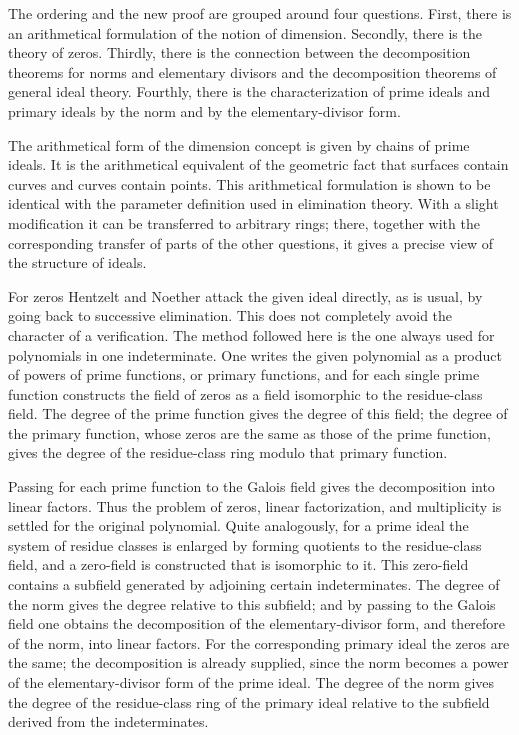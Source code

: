 \documentclass[11pt]{article}
\begin{document}
The ordering and the new proof are grouped around four questions. First, there is an arithmetical formulation of the notion of dimension. Secondly, there is the theory of zeros. Thirdly, there is the connection between the decomposition theorems for norms and elementary divisors and the decomposition theorems of general ideal theory. Fourthly, there is the characterization of prime ideals and primary ideals by the norm and by the elementary-divisor form.

The arithmetical form of the dimension concept is given by chains of prime ideals. It is the arithmetical equivalent of the geometric fact that surfaces contain curves and curves contain points. This arithmetical formulation is shown to be identical with the parameter definition used in elimination theory. With a slight modification it can be transferred to arbitrary rings; there, together with the corresponding transfer of parts of the other questions, it gives a precise view of the structure of ideals.

For zeros Hentzelt and Noether attack the given ideal directly, as is usual, by going back to successive elimination. This does not completely avoid the character of a verification. The method followed here is the one always used for polynomials in one indeterminate. One writes the given polynomial as a product of powers of prime functions, or primary functions, and for each single prime function constructs the field of zeros as a field isomorphic to the residue-class field. The degree of the prime function gives the degree of this field; the degree of the primary function, whose zeros are the same as those of the prime function, gives the degree of the residue-class ring modulo that primary function.

Passing for each prime function to the Galois field gives the decomposition into linear factors. Thus the problem of zeros, linear factorization, and multiplicity is settled for the original polynomial. Quite analogously, for a prime ideal the system of residue classes is enlarged by forming quotients to the residue-class field, and a zero-field is constructed that is isomorphic to it. This zero-field contains a subfield generated by adjoining certain indeterminates. The degree of the norm gives the degree relative to this subfield; and by passing to the Galois field one obtains the decomposition of the elementary-divisor form, and therefore of the norm, into linear factors. For the corresponding primary ideal the zeros are the same; the decomposition is already supplied, since the norm becomes a power of the elementary-divisor form of the prime ideal. The degree of the norm gives the degree of the residue-class ring of the primary ideal relative to the subfield derived from the indeterminates.
\end{document}
